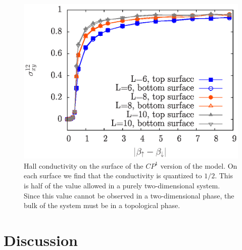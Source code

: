\documentclass[prb,twocolumn]{revtex4}
\begin{document}
\begin{figure}
\includegraphics[angle=-90,width=0.9\linewidth]{figures/cp1hall.eps}
\caption{Hall conductivity on the surface of the $CP^1$ version of the model. On each surface we find that the conductivity is quantized to $1/2$. This is half of the value allowed in a purely two-dimensional system. Since this value cannot be observed in a two-dimensional phase, the bulk of the system must be in a topological phase.}
\label{cp1hall}
\end{figure}

\section{Discussion}
\end{document}
